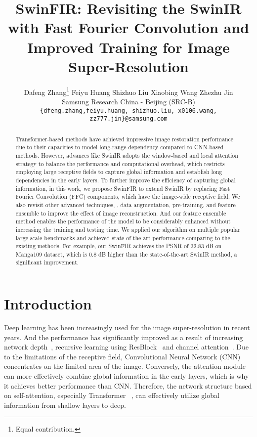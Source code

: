 \documentclass[10pt,twocolumn,letterpaper]{article}
\begin{document}
\title{SwinFIR: Revisiting the SwinIR with Fast Fourier Convolution and Improved Training for Image Super-Resolution}

\author{ Dafeng Zhang\thanks{Equal contribution.}\hspace{20pt}  Feiyu Huang\footnotemark[1]  \hspace{20pt} Shizhuo Liu\hspace{20pt} Xiaobing Wang\hspace{20pt} Zhezhu Jin\\ 
{} Samsung Research China - Beijing (SRC-B) \\
{\tt\small \{dfeng.zhang,feiyu.huang, shizhuo.liu, x0106.wang, zz777.jin\}@samsung.com}
}


\maketitle


\begin{abstract}
Transformer-based methods have achieved impressive image restoration performance due to their capacities to model long-range dependency compared to CNN-based methods. However, advances like SwinIR adopts the window-based and local attention strategy to balance the performance and computational overhead, which restricts employing large receptive fields to capture global information and establish long dependencies in the early layers. To further improve the efficiency of capturing global information, in this work, we propose SwinFIR to extend SwinIR by replacing Fast Fourier Convolution (FFC) components, which have the image-wide receptive field. We also revisit other advanced techniques, \ie, data augmentation, pre-training, and feature ensemble to improve the effect of image reconstruction. And our feature ensemble method enables the performance of the model to be considerably enhanced without increasing the training and testing time. We applied our algorithm on multiple popular large-scale benchmarks and achieved state-of-the-art performance comparing to the existing methods. For example, our SwinFIR achieves the PSNR of 32.83 dB on Manga109 dataset, which is 0.8 dB higher than the state-of-the-art SwinIR method, a significant improvement.
\end{abstract}
 \section{Introduction}
Deep learning has been increasingly used for the image super-resolution in recent years. And the performance has significantly improved as a result of increasing network depth~\cite{lim2017enhanced}, recursive learning using ResBlock~\cite{kim2016deeply} and channel attention~\cite{zhang2018image}. Due to the limitations of the receptive field, Convolutional Neural Network (CNN) concentrates on the limited area of the image. Conversely, the attention module can more effectively combine global information in the early layers, which is why it achieves better performance than CNN. Therefore, the network structure based on self-attention, especially Transformer ~\cite{vaswani2017attention, liu2021swin}, can effectively utilize global information from shallow layers to deep.
\end{document}

